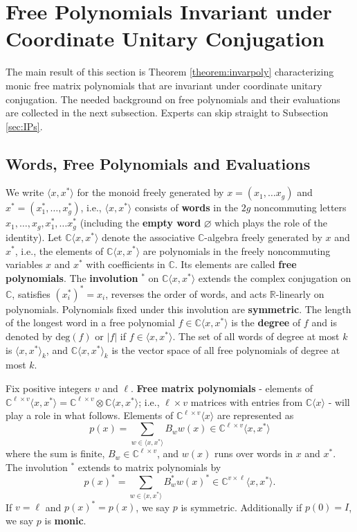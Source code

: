 \documentclass[12pt,makeidx]{amsart}
\renewcommand{\emptyset}{\varnothing}
\def\beq{\begin{equation}}
\def\eeq{\end{equation}}
\numberwithin{equation}{section}
\def\R{ {\mathbb{R}} }
\def\C{ {\mathbb{C}} }
\newcommand{\df}[1]{{\bf{#1}}{\index{#1}}}
\begin{document}
\section{Free Polynomials  Invariant under Coordinate Unitary Conjugation}\label{sec:UnitaryConjPoly}
The main result of this section is 
Theorem \ref{theorem:invarpoly} characterizing monic free matrix polynomials
that are invariant under coordinate unitary conjugation.  The needed background on free polynomials and their evaluations are collected in the next subsection. Experts can skip straight to Subsection \ref{sec:IPs}.

\subsection{Words,  Free Polynomials and Evaluations}
We write $\langle x,x^* \rangle$ for the monoid freely generated by $x=(x_1, \dots x_g)$
 and $x^*=(x_1^*, \dots, x_g^*)$, i.e., $\langle x,x^* \rangle$ consists of {\bf words} in 
the $2g$ noncommuting letters $x_1, \dots , x_g,x_1^*, \dots x_g^*$ (including the
 {\bf empty word} $\emptyset$ which plays the role of the identity). Let $\C \langle x,x^* \rangle$ 
denote the associative $\C$-algebra freely generated by $x$ and $x^*$, i.e., the elements
 of $\C \langle x,x^* \rangle$ are polynomials in the freely noncommuting variables $x$ and
 $x^*$ with coefficients in $\C$. Its elements are called {\bf free polynomials}. The
 {\bf involution} $^*$ on $\C \langle x,x^* \rangle$ extends the complex conjugation
 on $\C$, satisfies $(x_i^*)^*=x_i$, reverses the order of words, and acts $\R$-linearly
 on polynomials. Polynomials fixed under this involution are {\bf symmetric}.
The length of the longest word in a free polynomial $f \in \C \langle x,x^* \rangle$ is the 
{\bf degree} of $f$ and is denoted by $\text{deg}(f)$ or $|f|$ if $f \in \langle x,x^* \rangle$.
 The set of all words of degree at most $k$ is $\langle x,x^* \rangle_k$, and $\C \langle x,x^* \rangle_k$ is 
the vector space of all free polynomials of degree at most $k$. 

Fix positive integers $v$ and $\ell$. {\bf Free matrix polynomials} - elements of 
$\C^{\ell \times v} \langle x,x^* \rangle= \C^{\ell \times v} \otimes \C \langle x,x^* \rangle$; 
i.e., $\ell \times v$ matrices with entries from $\C \langle x \rangle$ - will play a role in what
 follows. Elements of $\C^{\ell  \times v} \langle x \rangle$ are represented as 
\beq
\label{eq:freepolydef}
p(x)=\sum_{w \in \langle x,x^* \rangle} B_w w(x) \in \C^{\ell \times v} \langle x,x^* \rangle
\eeq
where the sum is finite, $B_w \in \C^{\ell \times v}$,
and $w(x)$ runs over words in $x$ and $x^*$. The involution $^*$ extends to matrix polynomials by
\[
p(x)^*=\sum_{w \in \langle x, x^* \rangle} B_{w}^* w(x)^* \in \C^{v \times \ell} \langle x,x^* \rangle.
\]
If $v= \ell$ and $p(x)^*=p(x)$, we say $p$ is symmetric. Additionally if $p(0)=I$, we say $p$ is \df{monic}.
\end{document}
